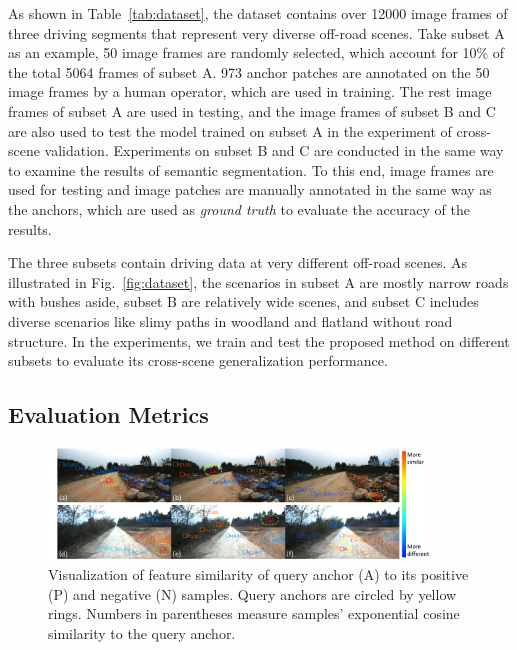 \documentclass[letterpaper, 10 pt, conference]{ieeeconf}  %
\begin{document}
	As shown in Table~\ref{tab:dataset}, the dataset contains over 12000 image frames of three driving segments that represent very diverse off-road scenes.
	Take subset A as an example, 50 image frames are randomly selected, which account for 10\% of the total 5064 frames of subset A. 
	973 anchor patches are annotated on the 50 image frames by a human operator, which are used in training.
	The rest image frames of subset A are used in testing, 
	and the image frames of subset B and C are also used to test the model trained on subset A in the experiment of cross-scene validation.
	Experiments on subset B and C are conducted in the same way to examine the results of semantic segmentation.
	To this end, image frames are used for testing and image patches are manually annotated in the same way as the anchors, which are used as \textit{ground truth} to evaluate the accuracy of the results.
	
	The three subsets contain driving data at very different off-road scenes. 
	As illustrated in Fig.~\ref{fig:dataset}, the scenarios in
	subset A are mostly narrow roads with bushes aside, subset B are relatively wide scenes, and subset C includes diverse
	scenarios like slimy paths in woodland and flatland without
	road structure. In the experiments, we train and test the
	proposed method on different subsets to evaluate its cross-scene generalization performance.
	
	\subsection{Evaluation Metrics}
	
	\begin{figure}[]
		\centering
		\includegraphics[width=0.9\textwidth]{anchor_dis.pdf}
		\caption{Visualization of feature similarity of query anchor (A) to its positive (P) and negative (N) samples. Query anchors are circled by yellow rings. Numbers in parentheses measure samples' exponential cosine similarity to the query anchor.}
		\label{fig:anchor_dis}
	\end{figure}
	
\end{document}
